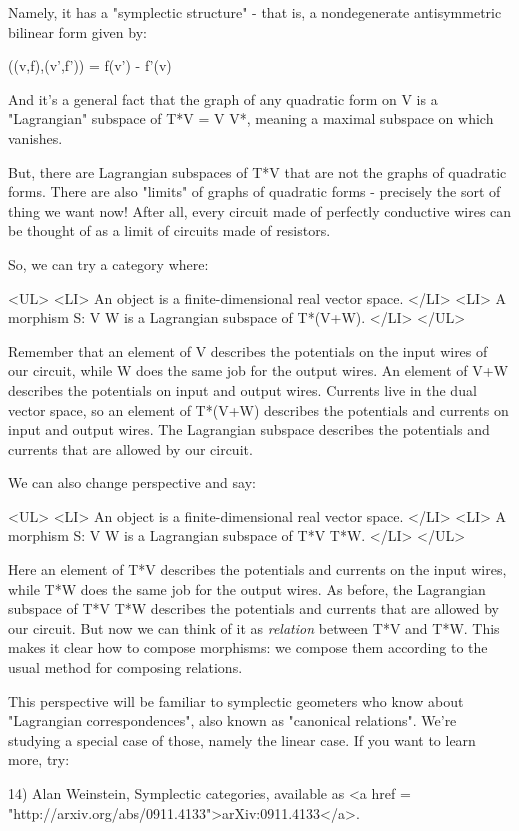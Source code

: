 Namely, it has a "symplectic structure" - that is, a nondegenerate
antisymmetric bilinear form \omega  given by:

\omega ((v,f),(v',f')) = f(v') - f'(v)

And it's a general fact that the graph of any quadratic form on V is a
"Lagrangian" subspace of T*V = V \times  V*, meaning a
maximal subspace on which \omega  vanishes.

But, there are Lagrangian subspaces of T*V that are not the graphs of
quadratic forms.  There are also "limits" of graphs of quadratic
forms - precisely the sort of thing we want now!  After all, every
circuit made of perfectly conductive wires can be thought of as a 
limit of circuits made of resistors.

So, we can try a category where:

<UL>
<LI>
  An object is a finite-dimensional real vector space.  
</LI>
<LI>
  A morphism S: V \to  W is a Lagrangian subspace of T*(V+W).
</LI>
</UL>

Remember that an element of V describes the potentials on the input
wires of our circuit, while W does the same job for the output wires.
An element of V+W describes the potentials on input and output wires.
Currents live in the dual vector space, so an element of T*(V+W)
describes the potentials and currents on input and output wires.  The
Lagrangian subspace describes the potentials and currents that are
allowed by our circuit.

We can also change perspective and say:

<UL>
<LI>
  An object is a finite-dimensional real vector space.  
</LI>
<LI>
  A morphism S: V \to  W is a Lagrangian subspace of T*V \times  T*W.
</LI>
</UL>

Here an element of T*V describes the potentials and currents on the
input wires, while T*W does the same job for the output wires.  As
before, the Lagrangian subspace of T*V \times  T*W describes the potentials
and currents that are allowed by our circuit.  But now we can think of
it as \emph{relation} between T*V and T*W.  This makes it clear how to
compose morphisms: we compose them according to the usual method for 
composing relations.

This perspective will be familiar to symplectic geometers who know
about "Lagrangian correspondences", also known as
"canonical relations".  We're studying a special case of
those, namely the linear case.  If you want to learn more, try:

14) Alan Weinstein, Symplectic categories, available as
<a href = "http://arxiv.org/abs/0911.4133">arXiv:0911.4133</a>.


